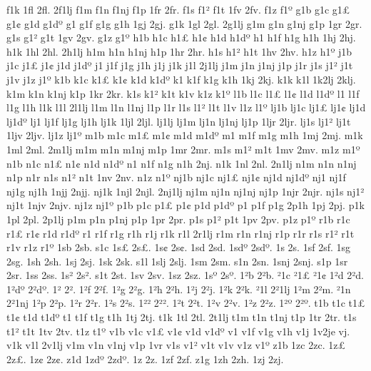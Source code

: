 {f1k
1fl
2fl.
2f1lj
f1m
f1n
f1nj
f1p
1fr
2fr.
f1s
f1^^b2
f1t
1fv
2fv.
f1z
f1^^ba
g1b
g1c
g1^^a3
g1^^a2
g1d
g1d^^ba
g1^^9e
g1f
g1g
g1h
1gj
2gj.
g1k
1gl
2gl.
2g1lj
g1m
g1n
g1nj
g1p
1gr
2gr.
g1s
g1^^b2
g1t
1gv
2gv.
g1z
g1^^ba
h1b
h1c
h1^^a3
h1^^a2
h1d
h1d^^ba
h1^^9e
h1f
h1g
h1h
1hj
2hj.
h1k
1hl
2hl.
2h1lj
h1m
h1n
h1nj
h1p
1hr
2hr.
h1s
h1^^b2
h1t
1hv
2hv.
h1z
h1^^ba
j1b
j1c
j1^^a3
j1^^a2
j1d
j1d^^ba
j1^^9e
j1f
j1g
j1h
j1j
j1k
j1l
2j1lj
j1m
j1n
j1nj
j1p
j1r
j1s
j1^^b2
j1t
j1v
j1z
j1^^ba
k1b
k1c
k1^^a3
k1^^a2
k1d
k1d^^ba
k1^^9e
k1f
k1g
k1h
1kj
2kj.
k1k
k1l
1k2lj
2klj.
k1m
k1n
k1nj
k1p
1kr
2kr.
k1s
k1^^b2
k1t
k1v
k1z
k1^^ba
l1b
l1c
l1^^a3
l1^^a2
l1d
l1d^^ba
l1^^9e
l1f
l1g
l1h
l1k
l1l
2l1lj
l1m
l1n
l1nj
l1p
l1r
l1s
l1^^b2
l1t
l1v
l1z
l1^^ba
lj1b
lj1c
lj1^^a3
lj1^^a2
lj1d
lj1d^^ba
lj1^^9e
lj1f
lj1g
lj1h
lj1k
1ljl
2ljl.
lj1lj
lj1m
lj1n
lj1nj
lj1p
1ljr
2ljr.
lj1s
lj1^^b2
lj1t
1ljv
2ljv.
lj1z
lj1^^ba
m1b
m1c
m1^^a3
m1^^a2
m1d
m1d^^ba
m1^^9e
m1f
m1g
m1h
1mj
2mj.
m1k
1ml
2ml.
2m1lj
m1m
m1n
m1nj
m1p
1mr
2mr.
m1s
m1^^b2
m1t
1mv
2mv.
m1z
m1^^ba
n1b
n1c
n1^^a3
n1^^a2
n1d
n1d^^ba
n1^^9e
n1f
n1g
n1h
2nj.
n1k
1nl
2nl.
2n1lj
n1m
n1n
n1nj
n1p
n1r
n1s
n1^^b2
n1t
1nv
2nv.
n1z
n1^^ba
nj1b
nj1c
nj1^^a3
nj1^^a2
nj1d
nj1d^^ba
nj1^^9e
nj1f
nj1g
nj1h
1njj
2njj.
nj1k
1njl
2njl.
2nj1lj
nj1m
nj1n
nj1nj
nj1p
1njr
2njr.
nj1s
nj1^^b2
nj1t
1njv
2njv.
nj1z
nj1^^ba
p1b
p1c
p1^^a3
p1^^a2
p1d
p1d^^ba
p1^^9e
p1f
p1g
2p1h
1pj
2pj.
p1k
1pl
2pl.
2p1lj
p1m
p1n
p1nj
p1p
1pr
2pr.
p1s
p1^^b2
p1t
1pv
2pv.
p1z
p1^^ba
r1b
r1c
r1^^a3
r1^^a2
r1d
r1d^^ba
r1^^9e
r1f
r1g
r1h
r1j
r1k
r1l
2r1lj
r1m
r1n
r1nj
r1p
r1r
r1s
r1^^b2
r1t
r1v
r1z
r1^^ba
1sb
2sb.
s1c
1s^^a3
2s^^a3.
1s^^a2
2s^^a2.
1sd
2sd.
1sd^^ba
2sd^^ba.
1s^^9e
2s^^9e.
1sf
2sf.
1sg
2sg.
1sh
2sh.
1sj
2sj.
1sk
2sk.
s1l
1slj
2slj.
1sm
2sm.
s1n
2sn.
1snj
2snj.
s1p
1sr
2sr.
1ss
2ss.
1s^^b2
2s^^b2.
s1t
2st.
1sv
2sv.
1sz
2sz.
1s^^ba
2s^^ba.
1^^b2b
2^^b2b.
^^b21c
^^b21^^a3
^^b21^^a2
1^^b2d
2^^b2d.
1^^b2d^^ba
2^^b2d^^ba.
1^^b2^^9e
2^^b2^^9e.
1^^b2f
2^^b2f.
1^^b2g
2^^b2g.
1^^b2h
2^^b2h.
1^^b2j
2^^b2j.
1^^b2k
2^^b2k.
^^b21l
2^^b21lj
1^^b2m
2^^b2m.
^^b21n
2^^b21nj
1^^b2p
2^^b2p.
1^^b2r
2^^b2r.
1^^b2s
2^^b2s.
1^^b2^^b2
2^^b2^^b2.
1^^b2t
2^^b2t.
1^^b2v
2^^b2v.
1^^b2z
2^^b2z.
1^^b2^^ba
2^^b2^^ba.
t1b
t1c
t1^^a3
t1^^a2
t1d
t1d^^ba
t1^^9e
t1f
t1g
t1h
1tj
2tj.
t1k
1tl
2tl.
2t1lj
t1m
t1n
t1nj
t1p
1tr
2tr.
t1s
t1^^b2
t1t
1tv
2tv.
t1z
t1^^ba
v1b
v1c
v1^^a3
v1^^a2
v1d
v1d^^ba
v1^^9e
v1f
v1g
v1h
v1j
1v2je
vj.
v1k
v1l
2v1lj
v1m
v1n
v1nj
v1p
1vr
v1s
v1^^b2
v1t
v1v
v1z
v1^^ba
z1b
1zc
2zc.
1z^^a3
2z^^a3.
1z^^a2
2z^^a2.
z1d
1zd^^ba
2zd^^ba.
1z^^9e
2z^^9e.
1zf
2zf.
z1g
1zh
2zh.
1zj
2zj.
}
